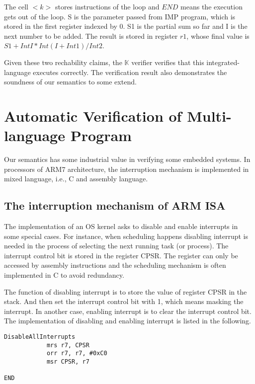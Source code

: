 \documentclass[letterpaper, 10 pt, conference]{IEEEtran}
\begin{document}
\par The cell $<k>$ stores instructions of the loop and $END$ means the execution gets out of the loop. S is the parameter passed from IMP program, which is stored in the first register indexed by 0. S1 is the partial sum so far and I is the next number to be added. The result is stored in register $r1$, whose final value is $S1 +Int I *Int (I +Int 1)/Int 2$.
\par Given these two rechability claims, the $\mathbb{K}$ verifier verifies that this integrated-language executes correctly. The verification result also demonstrates the soundness of our semantics to some extend.
\section{Automatic Verification of Multi-language Program}
\par Our semantics has some industrial value in verifying some embedded systems. In processors of ARM7 architecture, the interruption mechanism is implemented in mixed language, i.e., C and assembly language.
\subsection{The interruption mechanism of ARM ISA}
\par The implementation of an OS kernel asks to disable and enable interrupts in some special cases. For instance, when scheduling happens disabling interrupt is needed in the process of selecting the next running task (or process). The interrupt control bit is stored in the register CPSR. The register can only be accessed by assembly instructions and the scheduling mechanism is often implemented in C to avoid redundancy.
\par The function of disabling interrupt is to store the value of register CPSR in the stack. And then set the interrupt control bit with 1, which means masking the interrupt. In another case, enabling interrupt is to clear the interrupt control bit. The implementation of disabling and enabling interrupt is listed in the following.
\vspace{11pt}
\begin{lstlisting}[xleftmargin=1em]
DisableAllInterrupts					
			mrs r7, CPSR								
			orr r7, r7, #0xC0						
			msr CPSR, r7								
			
END	
\end{lstlisting}
\end{document}
